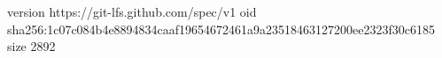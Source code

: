 version https://git-lfs.github.com/spec/v1
oid sha256:1c07c084b4e8894834caaf19654672461a9a23518463127200ee2323f30c6185
size 2892
